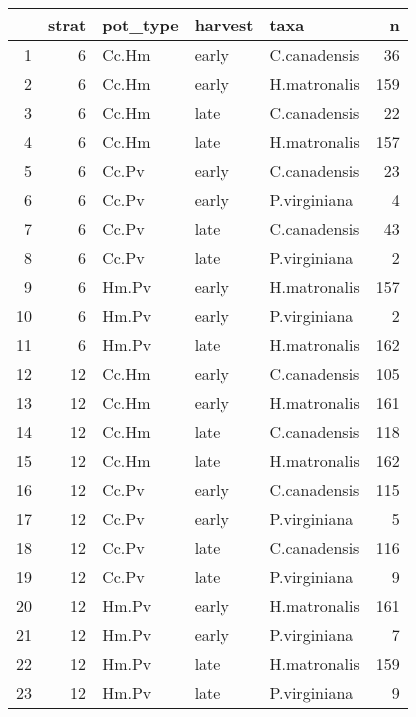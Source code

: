 \documentclass{article}\usepackage[]{graphicx}\usepackage[]{color}
\begin{document}
\begin{table}[ht]
\centering
\begin{tabular}{rrlllr}
  \hline
 & strat & pot\_type & harvest & taxa & n \\ 
  \hline
1 &   6 & Cc.Hm & early & C.canadensis &  36 \\ 
  2 &   6 & Cc.Hm & early & H.matronalis & 159 \\ 
  3 &   6 & Cc.Hm & late & C.canadensis &  22 \\ 
  4 &   6 & Cc.Hm & late & H.matronalis & 157 \\ 
  5 &   6 & Cc.Pv & early & C.canadensis &  23 \\ 
  6 &   6 & Cc.Pv & early & P.virginiana &   4 \\ 
  7 &   6 & Cc.Pv & late & C.canadensis &  43 \\ 
  8 &   6 & Cc.Pv & late & P.virginiana &   2 \\ 
  9 &   6 & Hm.Pv & early & H.matronalis & 157 \\ 
  10 &   6 & Hm.Pv & early & P.virginiana &   2 \\ 
  11 &   6 & Hm.Pv & late & H.matronalis & 162 \\ 
  12 &  12 & Cc.Hm & early & C.canadensis & 105 \\ 
  13 &  12 & Cc.Hm & early & H.matronalis & 161 \\ 
  14 &  12 & Cc.Hm & late & C.canadensis & 118 \\ 
  15 &  12 & Cc.Hm & late & H.matronalis & 162 \\ 
  16 &  12 & Cc.Pv & early & C.canadensis & 115 \\ 
  17 &  12 & Cc.Pv & early & P.virginiana &   5 \\ 
  18 &  12 & Cc.Pv & late & C.canadensis & 116 \\ 
  19 &  12 & Cc.Pv & late & P.virginiana &   9 \\ 
  20 &  12 & Hm.Pv & early & H.matronalis & 161 \\ 
  21 &  12 & Hm.Pv & early & P.virginiana &   7 \\ 
  22 &  12 & Hm.Pv & late & H.matronalis & 159 \\ 
  23 &  12 & Hm.Pv & late & P.virginiana &   9 \\ 
   \hline
\end{tabular}
\end{table}
\end{document}
